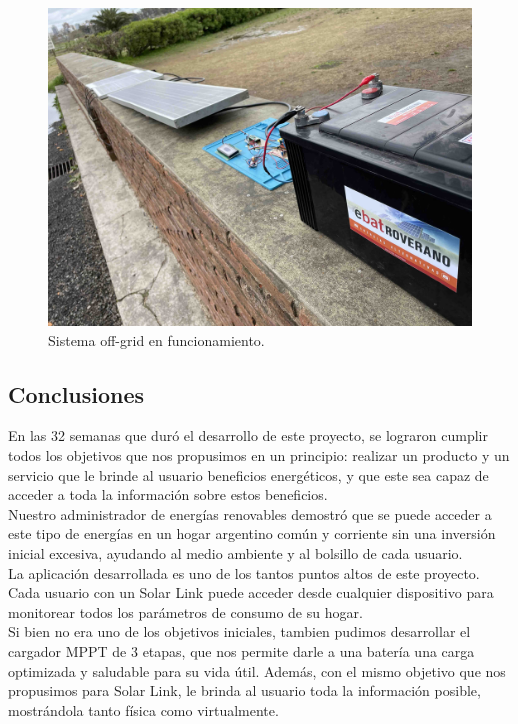 \begin{figure}[H]
    \centering
    \includegraphics[width=1\linewidth]{proto-final/IMG_8911.jpg}
    \caption{Sistema off-grid en funcionamiento.}
    \label{fig:off-grid}
\end{figure}

\subsection{Conclusiones}

En las 32 semanas que duró el desarrollo de este proyecto, se lograron cumplir todos los objetivos que nos propusimos en un principio: realizar un producto y un servicio que le brinde al usuario beneficios energéticos, y que este sea capaz de acceder a toda la información sobre estos beneficios.\\

Nuestro administrador de energías renovables demostró que se puede acceder a este tipo de energías en un hogar argentino común y corriente sin una inversión inicial excesiva, ayudando al medio ambiente y al bolsillo de cada usuario.\\

La aplicación desarrollada es uno de los tantos puntos altos de este proyecto. Cada usuario con un Solar Link puede acceder desde cualquier dispositivo para monitorear todos los parámetros de consumo de su hogar.\\

Si bien no era uno de los objetivos iniciales, tambien pudimos desarrollar el cargador MPPT de 3 etapas, que nos permite darle a una batería una carga optimizada y saludable para su vida útil. Además, con el mismo objetivo que nos propusimos para Solar Link, le brinda al usuario toda la información posible, mostrándola tanto física como virtualmente.\\

